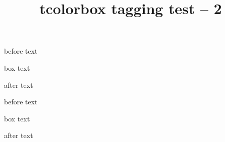 \documentclass{article}
\title{tcolorbox tagging test -- 2}
\begin{document}
before text
\begin{tcolorbox}[]
box text
\end{tcolorbox}
after text

before text
\begin{tcolorbox}[capture=hbox]
box text
\end{tcolorbox}
after text
\end{document}
